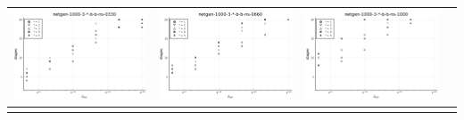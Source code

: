 \documentclass{article}
\begin{document}
\begin{landscape}
\begin{center}
\begin{longtable}{| c | c | c | c |}
\includegraphics[height=0.22\textheight]{hiter_fixlim_netgen-1000-3-_-b-b-ns-0330.png} &
\includegraphics[height=0.22\textheight]{hiter_fixlim_netgen-1000-3-_-b-b-ns-0660.png} &
\includegraphics[height=0.22\textheight]{hiter_fixlim_netgen-1000-3-_-b-b-ns-1000.png} \\
                \hline
\label{table:hiters}
    \end{longtable}
    \end{center}
    \end{landscape}

    
\end{document}
